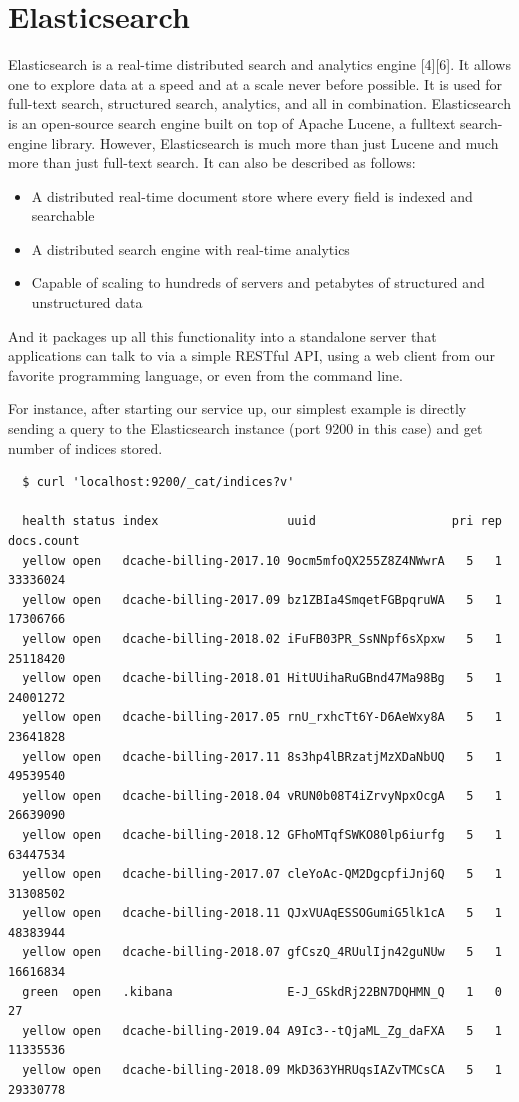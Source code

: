 \documentclass[]{article}
\begin{document}
\section{Elasticsearch}\label{elasticsearch}

Elasticsearch is a real-time distributed search and analytics engine
{[}4{]}{[}6{]}. It allows one to explore data at a speed and at a scale
never before possible. It is used for full-text search, structured
search, analytics, and all in combination. Elasticsearch is an
open-source search engine built on top of Apache Lucene, a fulltext
search-engine library. However, Elasticsearch is much more than just
Lucene and much more than just full-text search. It can also be
described as follows:

\begin{itemize}
\itemsep1pt\parskip0pt
\item
  A distributed real-time document store where every field is indexed
  and searchable
\item
  A distributed search engine with real-time analytics
\item
  Capable of scaling to hundreds of servers and petabytes of structured
  and unstructured data
\end{itemize}

And it packages up all this functionality into a standalone server that
applications can talk to via a simple RESTful API, using a web client
from our favorite programming language, or even from the command line.

For instance, after starting our service up, our simplest example is
directly sending a query to the Elasticsearch instance (port 9200 in
this case) and get number of indices stored.

\begin{verbatim}
  $ curl 'localhost:9200/_cat/indices?v'

  health status index                  uuid                   pri rep docs.count
  yellow open   dcache-billing-2017.10 9ocm5mfoQX255Z8Z4NWwrA   5   1   33336024
  yellow open   dcache-billing-2017.09 bz1ZBIa4SmqetFGBpqruWA   5   1   17306766
  yellow open   dcache-billing-2018.02 iFuFB03PR_SsNNpf6sXpxw   5   1   25118420
  yellow open   dcache-billing-2018.01 HitUUihaRuGBnd47Ma98Bg   5   1   24001272
  yellow open   dcache-billing-2017.05 rnU_rxhcTt6Y-D6AeWxy8A   5   1   23641828
  yellow open   dcache-billing-2017.11 8s3hp4lBRzatjMzXDaNbUQ   5   1   49539540
  yellow open   dcache-billing-2018.04 vRUN0b08T4iZrvyNpxOcgA   5   1   26639090
  yellow open   dcache-billing-2018.12 GFhoMTqfSWKO80lp6iurfg   5   1   63447534
  yellow open   dcache-billing-2017.07 cleYoAc-QM2DgcpfiJnj6Q   5   1   31308502
  yellow open   dcache-billing-2018.11 QJxVUAqESSOGumiG5lk1cA   5   1   48383944
  yellow open   dcache-billing-2018.07 gfCszQ_4RUulIjn42guNUw   5   1   16616834
  green  open   .kibana                E-J_GSkdRj22BN7DQHMN_Q   1   0         27
  yellow open   dcache-billing-2019.04 A9Ic3--tQjaML_Zg_daFXA   5   1   11335536
  yellow open   dcache-billing-2018.09 MkD363YHRUqsIAZvTMCsCA   5   1   29330778
\end{verbatim}
\end{document}
